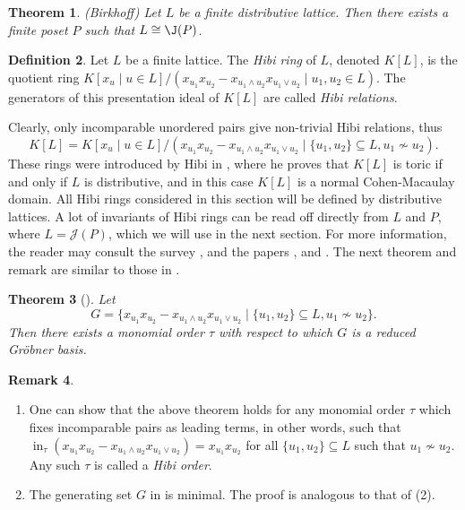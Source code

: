 \documentclass[12pt]{amsart}
\numberwithin{equation}{section}
\newtheorem{theorem}{Theorem}[section]
\theoremstyle{definition}
\newtheorem{definition}[theorem]{Definition}
\newtheorem{remark}[theorem]{Remark}
\DeclareMathOperator{\ini}{in}
\begin{document}
\begin{theorem}(Birkhoff)
Let $L$ be a finite distributive lattice. Then there exists a finite poset $P$ such that $L\cong \J(P)$. 
\end{theorem}
\begin{definition}
    Let $L$ be a finite lattice. The \emph{Hibi ring} of $L$, denoted $K[L]$, is the quotient ring $K[x_u\mid u\in L]/(x_{u_1}x_{u_2}-x_{u_1\wedge u_2}x_{u_1\vee u_2}\mid u_1,u_2\in L)$.  
    The generators of this presentation ideal of $K[L]$ are called \emph{Hibi relations}.
\end{definition}
Clearly, only incomparable unordered pairs give non-trivial Hibi relations, thus  $$K[L]=K[x_u\mid u\in L]/(x_{u_1}x_{u_2}-x_{u_1\wedge u_2}x_{u_1\vee u_2}\mid \{u_1,u_2\}\subseteq L, u_1\nsim u_2).$$
These rings were introduced by Hibi in \cite{Hi}, where he proves that $K[L]$ is toric if and only if $L$ is distributive, and in this case $K[L]$ is a normal Cohen-Macaulay domain. All Hibi rings considered in this section will be defined by distributive lattices. A lot of invariants of Hibi rings can be read off directly from $L$ and $P$, where $L=\mathcal{J}(P)$, which we will use in the next section. For more information, the reader may consult the survey \cite{E}, and the papers \cite{EHM}, \cite{Hi} and \cite{HiHi}. The next theorem and remark are similar to those in .

\begin{theorem}[{\cite[Theorem 10.1.3]{HH}}] 
\label{thm:hibiGB}
Let $$G=\{x_{u_1}x_{u_2}-x_{u_1\wedge u_2}x_{u_1\vee u_2}\mid \{u_1,u_2\}\subseteq L, u_1\nsim u_2\}.$$
Then there exists a monomial order $\tau$ with respect to which $G$ is a reduced Gröbner basis.
\end{theorem} 

\begin{remark}
\label{rem: hibiorder}
\begin{enumerate}
    \item One can show that the above theorem holds for any monomial order $\tau$ which fixes incomparable pairs as leading terms, in other words, such that $\ini_{\tau}(x_{u_1}x_{u_2}-x_{u_1\wedge u_2}x_{u_1\vee u_2})=x_{u_1}x_{u_2}$ for all $\{u_1, u_2\}\subseteq L$ such that $u_1\nsim u_2$.  Any such $\tau$ is called a \emph{Hibi order}.
\item The generating set $G$ in  is minimal. The proof is analogous to that of (2).


\end{enumerate}
\end{remark}
\end{document}
